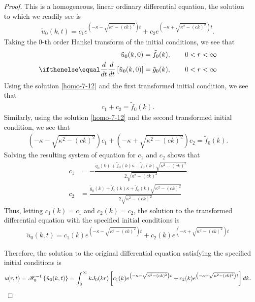 \begin{proof}
  This is a homogeneous, linear ordinary differential equation, the solution to which
  we readily see is
  \begin{align}\label{homo-7-12}
    \tilde{u}_0(k, t) = c_1 e^{\left(-\kappa - \sqrt{\kappa^2 - (ck)^2}\right)t}  + c_2 e^{\left(-\kappa + \sqrt{\kappa^2 - (ck)^2}\right)t}.
  \end{align}
  Taking the 0-th order Hankel transform of the initial conditions, we see that
  \begin{align*}
    \tilde{u}_0(k, 0) = \tilde{f}_0(k)&, \qquad 0 < r < \infty \\
    \der{t}{}\left[\tilde{u}_0(k, 0)\right] = \tilde{g}_0(k) &, \qquad 0 < r < \infty \\
  \end{align*}
  Using the solution \eqref{homo-7-12} and the first transformed initial condition, we see that
  \begin{align*}
    c_1 + c_2 = \tilde{f}_0(k).
  \end{align*}
  Similarly, using the solution \eqref{homo-7-12} and the second transformed initial condition,
  we see that
  \begin{align*}
    \left(-\kappa - \sqrt{\kappa^2 - (ck)^2}\right)c_1 + \left(-\kappa + \sqrt{\kappa^2 - (ck)^2}\right)c_2 = \tilde{f}_0(k).
  \end{align*}
  Solving the resulting system of equation for $c_1$ and $c_2$ shows that
  \begin{align*}
    c_1 &= - \frac{\tilde{g}_0(k) + \tilde{f}_0(k) \kappa - \tilde{f}_0(k)\sqrt{\kappa^2 - (ck)^2}}{2\sqrt{\kappa^2 - (ck)^2}} \\
    c_2 &= \frac{\tilde{g}_0(k) + \tilde{f}_0(k) \kappa + \tilde{f}_0(k)\sqrt{\kappa^2 - (ck)^2}}{2\sqrt{\kappa^2 - (ck)^2}}
  \end{align*}
  Thus, letting $c_1(k) = c_1$ and $c_2(k) = c_2$, the solution to the transformed differential equation with the
  specified initial conditions is
  \begin{align*}
    \tilde{u}_0(k, t) = c_1(k) e^{\left(-\kappa - \sqrt{\kappa^2 - (ck)^2}\right)t} + c_2(k)e^{\left(-\kappa + \sqrt{\kappa^2 - (ck)^2}\right)t}
  \end{align*}

  Therefore, the solution to the original differential equation satisfying the specified initial conditions is
  \begin{align*}
    u(r, t) = \mathscr{H}^{-1}_{ {0} }\left\{ {\tilde{u}_0(k, t)} \right\} = \int_0^\infty k J_0(k r) \left[c_1(k) e^{\left(-\kappa - \sqrt{\kappa^2 - (ck)^2}\right)t} + c_2(k)e^{\left(-\kappa + \sqrt{\kappa^2 - (ck)^2}\right)t}\right] dk.
  \end{align*}
\end{proof}
\newpage
